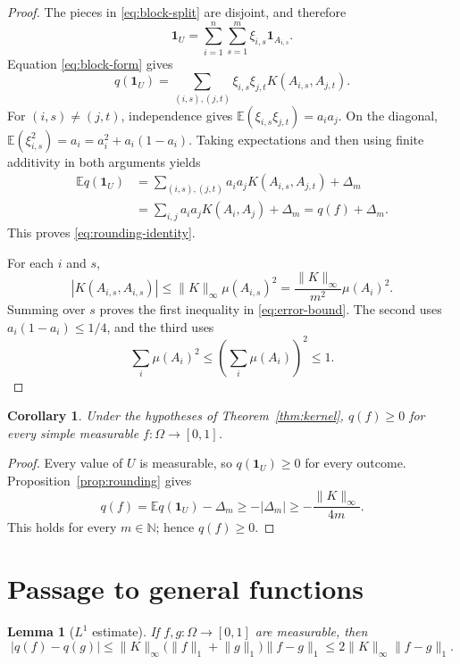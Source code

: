 \documentclass[10pt,a4paper]{amsart}
\newtheorem{lemma}[theorem]{Lemma}
\newtheorem{corollary}[theorem]{Corollary}
\newcommand{\one}{\mathbf 1}
\newcommand{\E}{\mathbb E}
\newcommand{\N}{\mathbb N}
\newcommand{\norminf}[1]{\lVert #1\rVert_\infty}
\newcommand{\normone}[1]{\lVert #1\rVert_1}
\begin{document}
\begin{proof}
The pieces in \eqref{eq:block-split} are disjoint, and therefore
\[
  \one_U=\sum_{i=1}^n\sum_{s=1}^m\xi_{i,s}\one_{A_{i,s}}.
\]
Equation \eqref{eq:block-form} gives
\[
  q(\one_U)=
  \sum_{(i,s),(j,t)}
  \xi_{i,s}\xi_{j,t}K(A_{i,s},A_{j,t}).
\]
For $(i,s)\neq(j,t)$, independence gives
$\E(\xi_{i,s}\xi_{j,t})=a_i a_j$. On the diagonal,
$\E(\xi_{i,s}^2)=a_i=a_i^2+a_i(1-a_i)$. Taking expectations and then using
finite additivity in both arguments yields
\[
\begin{split}
  \E q(\one_U)
  &=\sum_{(i,s),(j,t)}a_i a_jK(A_{i,s},A_{j,t})+\Delta_m\\
  &=\sum_{i,j}a_i a_jK(A_i,A_j)+\Delta_m
   =q(f)+\Delta_m.
\end{split}
\]
This proves \eqref{eq:rounding-identity}.

For each $i$ and $s$,
\[
  |K(A_{i,s},A_{i,s})|
  \leq\norminf{K}\mu(A_{i,s})^2
  =\frac{\norminf{K}}{m^2}\mu(A_i)^2.
\]
Summing over $s$ proves the first inequality in \eqref{eq:error-bound}. The
second uses $a_i(1-a_i)\leq1/4$, and the third uses
\[
  \sum_i\mu(A_i)^2
  \leq\left(\sum_i\mu(A_i)\right)^2
  \leq1.
\]
\end{proof}

\begin{corollary}\label{cor:simple}
Under the hypotheses of Theorem~\ref{thm:kernel}, $q(f)\geq0$ for every simple
measurable $f\colon\Omega\to[0,1]$.
\end{corollary}

\begin{proof}
Every value of $U$ is measurable, so $q(\one_U)\geq0$ for every outcome.
Proposition~\ref{prop:rounding} gives
\[
  q(f)=\E q(\one_U)-\Delta_m
  \geq-|\Delta_m|
  \geq-\frac{\norminf{K}}{4m}.
\]
This holds for every $m\in\N$; hence $q(f)\geq0$.
\end{proof}

\section{Passage to general functions}

\begin{lemma}[$L^1$ estimate]\label{lem:continuity}
If $f,g\colon\Omega\to[0,1]$ are measurable, then
\begin{equation}\label{eq:L1-bound}
  |q(f)-q(g)|
  \leq\norminf{K}\bigl(\normone{f}+\normone{g}\bigr)\normone{f-g}
  \leq2\norminf{K}\normone{f-g}.
\end{equation}
\end{lemma}
\end{document}
